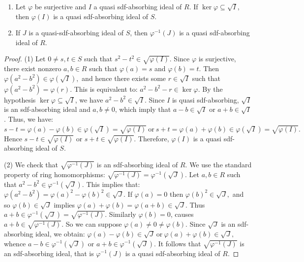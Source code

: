 \documentclass{amsart}%
\begin{document}
\begin{enumerate}
\item Let $\varphi$ be surjective and $I$ a quasi sdf-absorbing ideal of $R$.
If $\ker\varphi\subseteq\sqrt{I}$, then $\varphi(I)$ is a quasi sdf-absorbing
ideal of $S$.

\item If $J$ is a quasi-sdf-absorbing ideal of $S$, then $\varphi^{-1}(J)$ is
a quasi sdf-absorbing ideal of $R$.
\end{enumerate}

\begin{proof}
(1) Let $0\neq s,t\in S$ such that $s^{2}-t^{2}\in\sqrt{\varphi(I)}$. Since
$\varphi$ is surjective, there exist nonzero $a,b\in R$ such that
$\varphi(a)=s$ and $\varphi(b)=t$. Then $\varphi(a^{2}-b^{2})\in\varphi
(\sqrt{I}),$ and hence there exists some $r\in\sqrt{I}$ such that
$\varphi(a^{2}-b^{2})=\varphi(r)$. This is equivalent to: $a^{2}-b^{2}%
-r\in\ker\varphi.$ By the hypothesis $\ker\varphi\subseteq\sqrt{I}$, we have
$a^{2}-b^{2}\in\sqrt{I}$. Since $I$ is quasi sdf-absorbing, $\sqrt{I}$ is an
sdf-absorbing ideal and $a,b\neq0$, which imply that $a-b\in\sqrt{I}$ or
$a+b\in\sqrt{I}$. Thus, we have: $s-t=\varphi(a)-\varphi(b)\in\varphi(\sqrt
{I})=\sqrt{\varphi(I)}\ \text{or}\ s+t=\varphi(a)+\varphi(b)\in\varphi
(\sqrt{I})=\sqrt{\varphi(I)}.$ Hence $s-t\in\sqrt{\varphi(I)}$ or $s+t\in
\sqrt{\varphi(I)}$. Therefore, $\varphi(I)$ is a quasi sdf-absorbing ideal of
$S$.

(2) We check that $\sqrt{\varphi^{-1}(J)}$ is an sdf-absorbing ideal of $R$.
We use the standard property of ring homomorphisms: $\sqrt{\varphi^{-1}%
(J)}=\varphi^{-1}(\sqrt{J}).$ Let $a,b\in R$ such that $a^{2}-b^{2}\in
\varphi^{-1}(\sqrt{J})$. This implies that: $\varphi(a^{2}-b^{2}%
)=\varphi(a)^{2}-\varphi(b)^{2}\in\sqrt{J}.$ If $\varphi(a)=0$ then
$\varphi(b)^{2}\in\sqrt{J},$ and so $\varphi(b)\in\sqrt{J}$ implies
$\varphi(a)+\varphi(b)=\varphi(a+b)\in\sqrt{J}$. Thus $a+b\in\varphi
^{-1}(\sqrt{J})=\sqrt{\varphi^{-1}(J)}.$ Similarly $\varphi(b)=0$, causes
$a+b\in\sqrt{\varphi^{-1}(J)}.$ So we can suppose $\varphi(a)\neq0\neq
\varphi(b).$ Since $\sqrt{J}$ is an sdf-absorbing ideal, we obtain:
$\varphi(a)-\varphi(b)\in\sqrt{J}\ \text{or}\ \varphi(a)+\varphi(b)\in\sqrt
{J},$ whence $a-b\in\varphi^{-1}(\sqrt{J})$ or $a+b\in\varphi^{-1}(\sqrt{J})$.
It follows that $\sqrt{\varphi^{-1}(J)}$ is an sdf-absorbing ideal, that is
$\varphi^{-1}(J)$ is a quasi sdf-absorbing ideal of $R$.
\end{proof}
\end{document}
